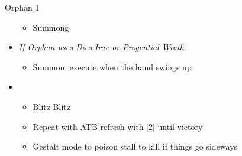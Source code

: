 \documentclass{report}
\begin{document}
\begin{battle}{Orphan 1}
\begin{multicols}{2}
\begin{itemize}
\begin{itemize}
        \item Summong
    \end{itemize}
    \item \textit{If Orphan uses Dies Irae or Progential Wrath}:
    \begin{itemize}
        \item Summon, execute when the hand swings up
    \end{itemize}
    \item \first
    \begin{itemize}
        \item Blitz-Blitz
        \item Repeat with ATB refresh with [2] until victory
        \item Gestalt mode to poison stall to kill if things go sideways
    \end{itemize}
\end{itemize}
\end{multicols}
\end{battle}
\end{document}
